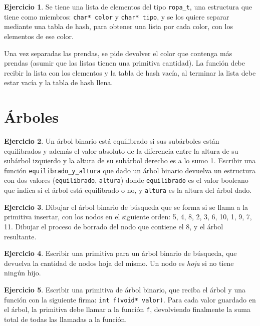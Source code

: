 \documentclass[11pt,a4paper]{article}
\theoremstyle{definition}
\newtheorem{ejercicio}{Ejercicio}[section]
\begin{document}
\begin{ejercicio}
Se tiene una lista de elementos del tipo \lstinline!ropa_t!, una estructura
que tiene como miembros: \lstinline!char* color! y \lstinline!char* tipo!,
y se los quiere separar mediante una tabla de hash, para obtener una lista
por cada color, con los elementos de ese color.

Una vez separadas las prendas, se pide devolver el color que contenga más
prendas (asumir que las listas tienen una primitiva cantidad). La función
debe recibir la lista con los elementos y la tabla de hash vacía, al
terminar la lista debe estar vacía y la tabla de hash llena.
\end{ejercicio}


\newpage
\section{Árboles}

\begin{ejercicio}
Un árbol binario está equilibrado si sus subárboles están equilibrados y
además el valor absoluto de la diferencia entre la altura de su subárbol
izquierdo y la altura de su subárbol derecho es a lo sumo 1.  Escribir una
función \lstinline!equilibrado_y_altura! que dado un árbol binario devuelva
un estructura con dos valores (\lstinline!equilibrado!, \lstinline!altura!)
donde \lstinline!equilibrado! es el valor booleano que indica si el árbol
está equilibrado o no, y \lstinline!altura! es la altura del árbol dado.
\end{ejercicio}

\begin{ejercicio}
\label{insercion_abb}
Dibujar el árbol binario de búsqueda que se forma si se llama a la primitiva
insertar, con los nodos en el siguiente orden: 5, 4, 8, 2, 3, 6, 10, 1, 9,
7, 11. Dibujar el proceso de borrado del nodo que contiene el 8, y el árbol
resultante.
\end{ejercicio}

\begin{ejercicio}
Escribir una primitiva para un árbol binario de búsqueda, que devuelva
la cantidad de nodos hoja del mismo. Un nodo es \textit{hoja} si no tiene
ningún hijo.
\end{ejercicio}

\begin{ejercicio}
Escribir una primitiva de árbol binario, que reciba el árbol y una función
con la siguiente firma: \lstinline!int f(void* valor)!. Para cada valor
guardado en el árbol, la primitiva debe llamar a la función \lstinline!f!,
devolviendo finalmente la suma total de todas las llamadas a la función.
\end{ejercicio}
\end{document}

